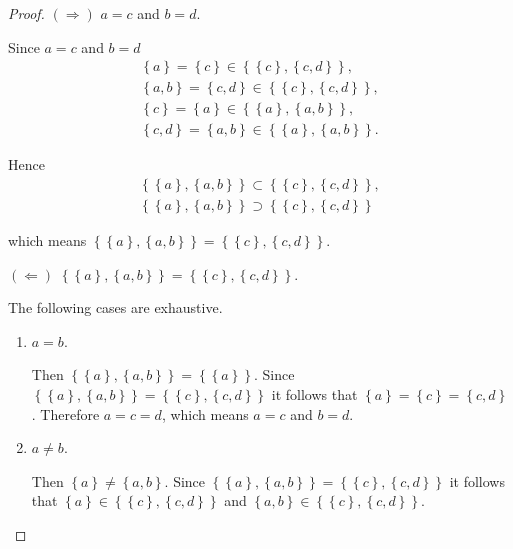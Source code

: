 \begin{proof}
	\( (\Longrightarrow) \) \( a = c \) and \( b = d \).

	Since \( a = c \) and \( b = d \)
	\[
		\begin{split}
			\left\{ a \right\} = \left\{ c \right\} \in \left\{ \left\{ c \right\}, \left\{ c, d \right\} \right\},       \\
			\left\{ a, b \right\} = \left\{ c, d \right\} \in \left\{ \left\{ c \right\}, \left\{ c, d \right\} \right\}, \\
			\left\{ c \right\} = \left\{ a \right\} \in \left\{ \left\{ a \right\}, \left\{ a, b \right\} \right\},       \\
			\left\{ c, d \right\} = \left\{ a, b \right\} \in \left\{ \left\{ a \right\}, \left\{ a, b \right\} \right\}.
		\end{split}
	\]

	Hence
	\[
		\begin{split}
			\left\{ \left\{ a \right\}, \left\{ a, b \right\} \right\} \subset \left\{ \left\{ c \right\}, \left\{ c, d \right\} \right\}, \\
			\left\{ \left\{ a \right\}, \left\{ a, b \right\} \right\} \supset \left\{ \left\{ c \right\}, \left\{ c, d \right\} \right\}
		\end{split}
	\]

	which means \( \left\{ \left\{ a \right\}, \left\{ a, b \right\} \right\} = \left\{ \left\{ c \right\}, \left\{ c, d \right\} \right\} \).

	\( (\Longleftarrow) \) \( \left\{ \left\{ a \right\}, \left\{ a, b \right\} \right\} = \left\{ \left\{ c \right\}, \left\{ c, d \right\} \right\} \).

	The following cases are exhaustive.
	\begin{enumerate}[label={\textbf{Case \arabic*.}},leftmargin=*]
		\item \( a = b \).

		      Then \( \left\{ \left\{ a \right\}, \left\{ a, b \right\} \right\} = \left\{ \left\{ a \right\} \right\} \). Since \( \left\{ \left\{ a \right\}, \left\{ a, b \right\} \right\} = \left\{ \left\{ c \right\}, \left\{ c, d \right\} \right\} \) it follows that \( \left\{ a \right\} = \left\{ c \right\} = \left\{ c, d \right\} \). Therefore \( a = c = d \), which means \( a = c \) and \( b = d \).
		\item \( a \ne b \).

		      Then \( \left\{ a \right\} \ne \left\{ a, b \right\} \). Since \( \left\{ \left\{ a \right\}, \left\{ a, b \right\} \right\} = \left\{ \left\{ c \right\}, \left\{ c, d \right\} \right\} \) it follows that \( \left\{ a \right\} \in \left\{ \left\{ c \right\}, \left\{ c, d \right\} \right\} \) and \( \left\{a, b\right\} \in \left\{ \left\{ c \right\}, \left\{ c, d \right\} \right\} \).


\end{enumerate}
\end{proof}
